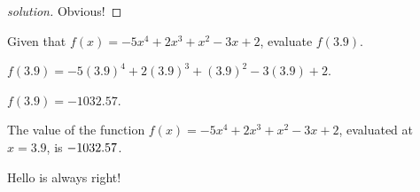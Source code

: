 

\begin{theorem}[Hello]
\end{theorem}

\begin{proof}[solution] Obvious!
\end{proof}


\begin{exercise}
Given that $f(x)=-5 x^4+2 x^3+x^2-3 x+2$, evaluate $f(3.9)$.
\begin{solution}
\begin{hint}
$f(3.9)=-5 (3.9)^4+2 (3.9)^3+(3.9)^2-3 (3.9)+2$.
\end{hint}
\begin{hint}
$f(3.9)=-1032.57$.
\end{hint}
The value of the function $f(x) = -5 x^4+2 x^3+x^2-3 x+2$, evaluated at $x=3.9$, is ${-1032.57}$.
\end{solution}
\end{exercise}


\begin{question}
\begin{multiple-choice}
\end{multiple-choice}
\begin{solution}
\begin{hint}
Hello is always right!
\end{hint}
\end{solution}
\end{question}





